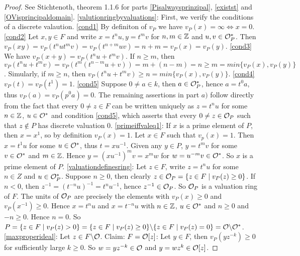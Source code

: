 \begin{proof}
	See Stichtenoth, theorem 1.1.6 for parts \ref{Pisalwaysprinzipal}, 
	\ref{existst} and 
	\ref{OVisprincipaldomain}. 
	\eqref{valutionringbyvaluations}:
	First, we verify the conditions of a discrete valaution. \eqref{cond1}  
	By definiton of $v_P$ we have $v_P(x)= \infty  \Leftrightarrow x = 0$. \eqref{cond2}
	Let $x,y \in F$ and write $x = t^nu, y = t^mv $ for $n,m \in \mathbb{Z}$ and 
	$u,v \in \mathcal{O}_P^*$. 
	Then $v_P(xy) = v_P(t^nut^mv) = v_P(t^{n+m}uv) = n + m = v_P(x) = v_P(y) $.
	\eqref{cond3} We have $v_P(x + y) = v_P(t^nu+t^mv)$. If $n \geq m $, 
	then $v_P(t^nu+t^mv) = v_P(t^m(t^{n-m}u+v)) = m + (n - m) = n \geq 
	m = min \lbrace v_P(x), v_P(y) \rbrace$. Simularly, if $m \geq n$, then
	$v_P(t^nu+t^mv) \geq n = min \lbrace v_P(x), v_P(y) \rbrace$. \eqref{cond4}
	$v_P(t) = v_P(t^1) = 1 $. \eqref{cond5} Suppose $0 \neq a \in k $, 
	then $a \in \mathcal{O}_P^*$, hence $a =t^0a $, thus $v_P(a) = v_P(p^0a) = 0$. 
	The remaining assertions in part $a)$ follow directly from the fact 
	that every $0 \neq z \in F$ can be written
	uniquely as $z = t^nu $ for some $n \in \mathbb{Z} $, $u \in \mathcal{O}^*$ and condition
	\eqref{cond5}, which asserts that every $0 \neq z \in \mathcal{O}_P$ such that $z \notin P$ 
	has discrete valuation $0$.
	\eqref{primeiffvaleq1}: 
	If $x$ is a prime element of $P$, then $x = x^1$, so 
	by definition $v_P(x) = 1$. 
	Let $x \in F$ such that $v_p(x) = 1$. Then $x = t^1u$ 
	for some $u \in \mathcal{O}^*$, thus $t = xu^{-1}$. Given any $y \in P$, $y = t^mv $ 
	for some $v \in \mathcal{O}^*$ and $m \in \mathbb{Z}$. Hence $y = (xu^{-1})^mv = x^mw $ 
	for $w = u^{-m}v \in \mathcal{O}^*$. So $x$ is a prime element of $P$.
	\eqref{valuationdefinesring}:
	Let $z \in F$, write $z = t^nu$ for some $n \in Z$ and $u \in \mathcal{O}_P^*$. 
	Suppose $n \geq 0$, then clearly 
	$z \in \mathcal{O}_P = \lbrace z \in F \mid  v_P(z) \geq  0  \rbrace  $. 
	If $n < 0 $, then $z^{-1} = (t^{-n}u)^{-1} = t^nu^{-1}$, 
	hence $z^{-1} \in \mathcal{O}_P$. So $\mathcal{O}_P$ is a valuation ring of $F$. 
	The units of $\mathcal{O}_P$ are precisely the elements with $v_P(x) \geq 0$ 
	and $v_P(x^{-1}) \geq 0$. Hence $x = t^nu$ and $x = t^{-n}u$ with 
	$n \in \mathbb{Z}$, $u \in \mathcal{O}^*$ and $n \geq 0$ and $-n \geq 0$. Hence $n = 0$. 
	So  $P = \lbrace z \in F \mid v_P(z) > 0  \rbrace = \lbrace z \in F \mid  
	v_P(z) \geq  0  \rbrace \backslash \lbrace z \in F \mid  v_P(z) = 0  
	 \rbrace = \mathcal{O} \backslash \mathcal{O}^*$. 
	\eqref{maxproperideal}: 
	Let $z \in F \backslash \mathcal{O}$. Claim: $F = \mathcal{O}[z]$: Let $y \in F$,
	then $v_P(yz^{-k}) \geq 0$ for sufficiently large $k\geq 0 $. So
	$w = yz^{-k} \in \mathcal{O}$ and $y=wz^k \in \mathcal{O}[z]$.
\end{proof}

